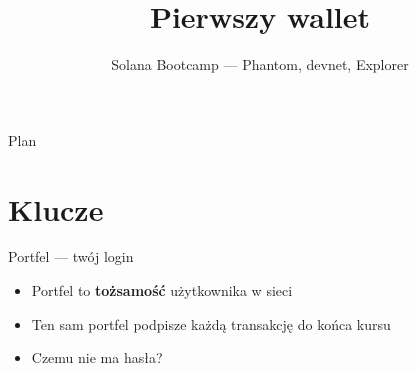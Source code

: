 

\usepackage[utf8]{inputenc}
\usepackage[T1]{fontenc}

\title{Pierwszy wallet}
\subtitle{Solana Bootcamp --- Phantom, devnet, Explorer}
\author{}

\newcommand{\screenshotph}[2][3.4cm]{%
  \begin{tikzpicture}
    \node[draw=stplmuted, dashed, line width=0.8pt,
          rounded corners=4pt, fill=stplcard,
          minimum width=\linewidth, minimum height=#1,
          align=center, text=stplmuted, font=\scriptsize\itshape,
          inner sep=4pt]
      {[ zrzut ekranu ]\\#2};
  \end{tikzpicture}}



\maketitleframe

\begin{frame}{Plan}
  \tableofcontents
\end{frame}

\section{Klucze}

\begin{frame}{Portfel --- twój login}
  \begin{itemize}
    \item Portfel to \textbf{tożsamość} użytkownika w sieci
    \item Ten sam portfel podpisze każdą transakcję do końca kursu
    \item Czemu nie ma hasła?
  \end{itemize}
\end{frame}

